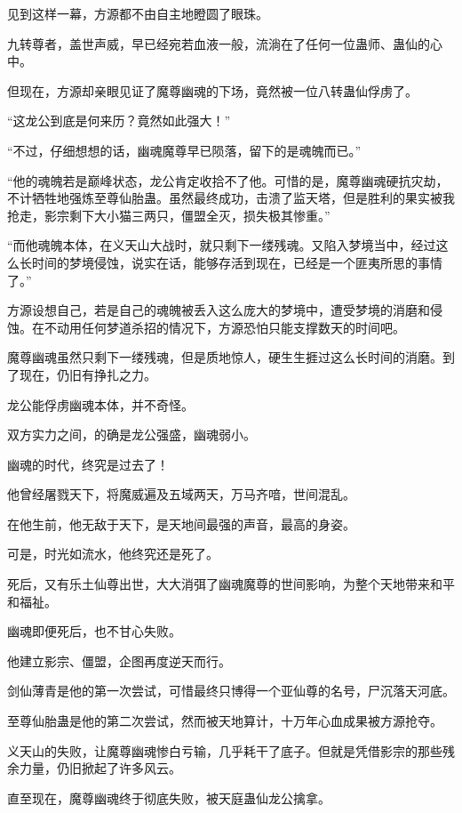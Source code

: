 
\begin{this_body}

见到这样一幕，方源都不由自主地瞪圆了眼珠。

九转尊者，盖世声威，早已经宛若血液一般，流淌在了任何一位蛊师、蛊仙的心中。

但现在，方源却亲眼见证了魔尊幽魂的下场，竟然被一位八转蛊仙俘虏了。

“这龙公到底是何来历？竟然如此强大！”

“不过，仔细想想的话，幽魂魔尊早已陨落，留下的是魂魄而已。”

“他的魂魄若是巅峰状态，龙公肯定收拾不了他。可惜的是，魔尊幽魂硬抗灾劫，不计牺牲地强炼至尊仙胎蛊。虽然最终成功，击溃了监天塔，但是胜利的果实被我抢走，影宗剩下大小猫三两只，僵盟全灭，损失极其惨重。”

“而他魂魄本体，在义天山大战时，就只剩下一缕残魂。又陷入梦境当中，经过这么长时间的梦境侵蚀，说实在话，能够存活到现在，已经是一个匪夷所思的事情了。”

方源设想自己，若是自己的魂魄被丢入这么庞大的梦境中，遭受梦境的消磨和侵蚀。在不动用任何梦道杀招的情况下，方源恐怕只能支撑数天的时间吧。

魔尊幽魂虽然只剩下一缕残魂，但是质地惊人，硬生生捱过这么长时间的消磨。到了现在，仍旧有挣扎之力。

龙公能俘虏幽魂本体，并不奇怪。

双方实力之间，的确是龙公强盛，幽魂弱小。

幽魂的时代，终究是过去了！

他曾经屠戮天下，将魔威遍及五域两天，万马齐喑，世间混乱。

在他生前，他无敌于天下，是天地间最强的声音，最高的身姿。

可是，时光如流水，他终究还是死了。

死后，又有乐土仙尊出世，大大消弭了幽魂魔尊的世间影响，为整个天地带来和平和福祉。

幽魂即便死后，也不甘心失败。

他建立影宗、僵盟，企图再度逆天而行。

剑仙薄青是他的第一次尝试，可惜最终只博得一个亚仙尊的名号，尸沉落天河底。

至尊仙胎蛊是他的第二次尝试，然而被天地算计，十万年心血成果被方源抢夺。

义天山的失败，让魔尊幽魂惨白亏输，几乎耗干了底子。但就是凭借影宗的那些残余力量，仍旧掀起了许多风云。

直至现在，魔尊幽魂终于彻底失败，被天庭蛊仙龙公擒拿。


\end{this_body}

